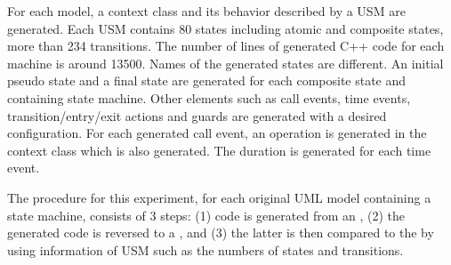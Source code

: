 For each model, a context class and its behavior described by a USM are generated. Each USM contains 80 states including atomic and composite states, more than 234 transitions. The number of lines of generated C++ code for each machine is around 13500. Names of the generated states are different. An initial pseudo state and a final state are generated for each composite state and containing state machine. Other elements such as call events, time events, transition/entry/exit actions and guards are generated with a desired configuration. For each generated call event, an operation is generated in the context class which is also generated. The duration is generated for each time event. 

The procedure for this experiment, for each original UML model containing a state machine, consists of 3 steps: (1) code is generated from an , (2) the generated code is reversed to a , and (3) the latter is then compared to the  by using information of USM such as the numbers of states and transitions. 

